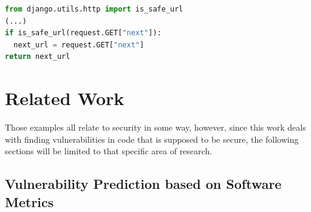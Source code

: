 \documentclass[
	a4paper,
	pagesize,
	pdftex,
	12pt,
	twoside, %
	BCOR=5mm, %
	ngerman,
	fleqn,
	final,
	]{scrartcl}
\begin{document}
\begin{lstlisting}[language=Python, showstringspaces=False]
from django.utils.http import is_safe_url
(...)
if is_safe_url(request.GET["next"]):
  next_url = request.GET["next"]
return next_url
\end{lstlisting}






\section{Related Work}\label{Related-Work}
Those examples all relate to security in some way, however, since this work deals with finding vulnerabilities in code that is supposed to be secure, the following sections will be limited to that specific area of research.\\

\subsection{Vulnerability Prediction based on Software Metrics}\mbox{}\\
\end{document}
